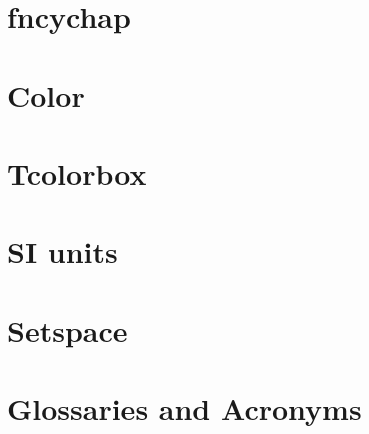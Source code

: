 \documentclass{report}
\begin{document}
\section{fncychap}

\section{Color}

\section{Tcolorbox}

\section{SI units}

\section{Setspace}

\section{Glossaries and Acronyms}
\end{document}
